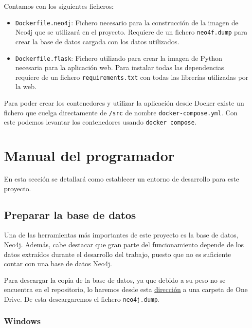 Contamos con los siguientes ficheros:

\begin{itemize}
	\item \texttt{Dockerfile.neo4j}: Fichero necesario para la construcción de la imagen de Neo4j que se utilizará en el proyecto. Requiere de un fichero \texttt{neo4f.dump} para crear la base de datos cargada con los datos utilizados.
	\item \texttt{Dockerfile.flask}: Fichero utilizado para crear la imagen de Python necesaria para la aplicación web. Para instalar todas las dependencias requiere de un fichero \texttt{requirements.txt} con todas las librerías utilizadas por la web.
\end{itemize}

Para poder crear los contenedores y utilizar la aplicación desde Docker existe un fichero que cuelga directamente de \texttt{/src} de nombre \texttt{docker-compose.yml}. Con este podemos levantar los contenedores usando \texttt{docker compose}.

\section{Manual del programador}

En esta sección se detallará como establecer un entorno de desarrollo para este proyecto.

\subsection{Preparar la base de datos}

Una de las herramientas más importantes de este proyecto es la base de datos, Neo4j. Además, cabe destacar que gran parte del funcionamiento depende de los datos extraídos durante el desarrollo del trabajo, puesto que no es suficiente contar con una base de datos Neo4j.

Para descargar la copia de la base de datos, ya que debido a su peso no se encuentra en el repositorio, lo haremos desde esta \href{https://universidaddeburgos-my.sharepoint.com/:f:/g/personal/mhu1001_alu_ubu_es/Evm-45Fq9y1Ps-F3_PGd5KsBNR3G0JAR2-t1IrXBDm2BEQ?e=rQP1ls} {dirección} a una carpeta de One Drive. De esta descargaremos el fichero \texttt{neo4j.dump}.

\subsubsection{Windows}

